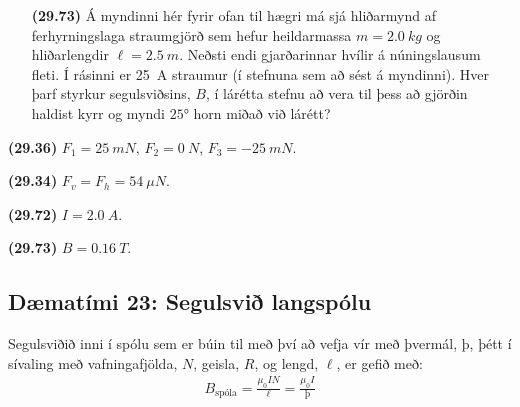 \begin{enumerate}[label = \textbf{(\alph*)}]
\item[\textbf{(29.73)}] Á myndinni hér fyrir ofan til hægri má sjá hliðarmynd af ferhyrningslaga straumgjörð sem hefur heildarmassa $m = \SI{2.0}{kg}$ og hliðarlengdir $\ell = \SI{2.5}{m}$. Neðsti endi gjarðarinnar hvílir á núningslausum fleti. Í rásinni er \SI{25}{A} straumur (í stefnuna sem að sést á myndinni). Hver þarf styrkur segulsviðsins, $B$, í lárétta stefnu að vera til þess að gjörðin haldist kyrr og myndi $\ang{25}$ horn miðað við lárétt?


\end{enumerate}


\begin{tcolorbox}
\begin{enumerate*}[label = ]
  \item \textbf{(29.36)} $F_1 = \SI{25}{mN}$, $F_2 = \SI{0}{N}$, $F_3 = \SI{-25}{mN}$.
  \item \textbf{(29.34)} $F_v = F_h = \SI{54}{\mu N}$.
  \item \textbf{(29.72)} $I = \SI{2.0}{A}$.
  \item \textbf{(29.73)} $B = \SI{0.16}{T}$.
\end{enumerate*}
\end{tcolorbox}


\newpage

\subsection*{Dæmatími 23: Segulsvið langspólu}

\begin{tcolorbox}
Segulsviðið inni í spólu sem er búin til með því að vefja vír með þvermál, $þ$, þétt í sívaling með vafningafjölda, $N$, geisla, $R$, og lengd, $\ell$, er gefið með: 
\begin{align*}
    B_{\text{spóla}} = \frac{\mu_0 I N}{\ell} = \frac{\mu_0 I}{þ}
\end{align*}
\end{tcolorbox}


